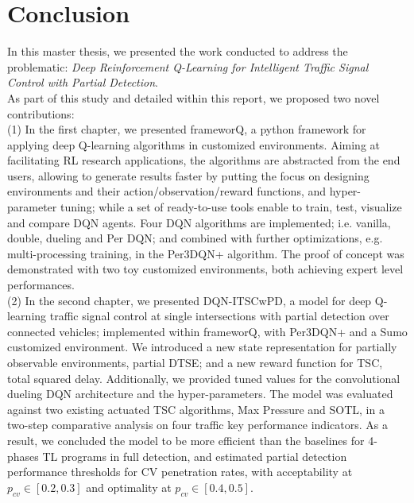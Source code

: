\section*{Conclusion}

In this master thesis, we presented the work conducted to address the problematic: \textit{Deep Reinforcement Q-Learning for Intelligent Traffic Signal Control with Partial Detection}.\\

As part of this study and detailed within this report, we proposed two novel contributions: \\

(1) In the first chapter, we presented frameworQ, a python framework for applying deep Q-learning algorithms in customized environments. Aiming at facilitating RL research applications, the algorithms are abstracted from the end users, allowing to generate results faster by putting the focus on designing environments and their action/observation/reward functions, and hyper-parameter tuning; while a set of ready-to-use tools enable to train, test, visualize and compare DQN agents. Four DQN algorithms are implemented; i.e.  vanilla, double, dueling and Per DQN; and combined with further optimizations, e.g. multi-processing training, in the Per3DQN+ algorithm. The proof of concept was demonstrated with two toy customized environments, both achieving expert level performances. \\

(2) In the second chapter, we presented DQN-ITSCwPD, a model for deep Q-learning traffic signal control at single intersections with partial detection over connected vehicles; implemented within frameworQ, with Per3DQN+ and a Sumo customized environment. We introduced a new state representation for partially observable environments, partial DTSE; and a new reward function for TSC, total squared delay. Additionally, we provided tuned values for the convolutional dueling DQN architecture and the hyper-parameters. The model was evaluated against two existing actuated TSC algorithms, Max Pressure and SOTL, in a two-step comparative analysis on four traffic key performance indicators. As a result, we concluded the model to be more efficient than the baselines for 4-phases TL programs in full detection, and estimated partial detection performance thresholds for CV penetration rates, with acceptability at $p_{cv} \in [0.2,0.3]$ and optimality at $p_{cv} \in [0.4,0.5]$. \\

